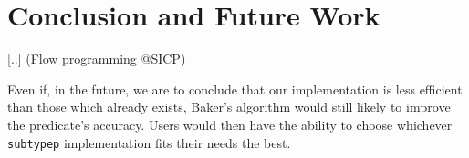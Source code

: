 \documentclass[format=sigconf]{acmart}
\newcommand\code[2][\small]{\sloppy\texttt{#1#2}}
\theoremstyle{definition}
\begin{document}
\section{Conclusion and Future Work}
[..] (Flow programming @SICP)

Even if, in the future, we are to conclude that our implementation is less
efficient than those which already exists, Baker's algorithm would still likely to
improve the predicate's accuracy. Users would then have the ability to
choose whichever \code{subtypep} implementation fits their needs the best.


\end{document}
